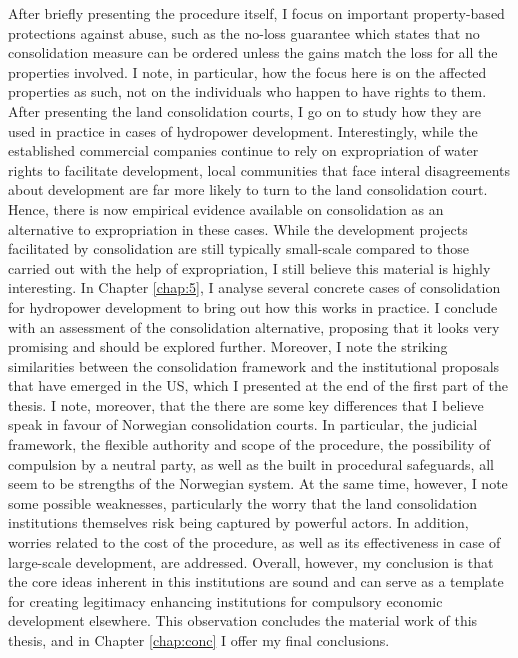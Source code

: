 \documentclass{article} %
\begin{document}
After briefly presenting the procedure itself, I focus on important property-based protections against abuse, such as the no-loss guarantee which states that no consolidation measure can be ordered unless the gains match the loss for all the properties involved. I note, in particular, how the focus here is on the affected properties as such, not on the individuals who happen to have rights to them. After presenting the land consolidation courts, I go on to study how they are used in practice in cases of hydropower development. Interestingly, while the established commercial companies continue to rely on expropriation of water rights to facilitate development, local communities that face interal disagreements about development are far more likely to turn to the land consolidation court. Hence, there is now empirical evidence available on consolidation as an alternative to expropriation in these cases. While the development projects facilitated by consolidation are still typically small-scale compared to those carried out with the help of expropriation, I still believe this material is highly interesting. In Chapter \ref{chap:5}, I analyse several concrete cases of consolidation for hydropower development to bring out how this works in practice. I conclude with an assessment of the consolidation alternative, proposing that it looks very promising and should be explored further. Moreover, I note the striking similarities between the consolidation framework and the institutional proposals that have emerged in the US, which I presented at the end of the first part of the thesis. I note, moreover, that the there are some key differences that I believe speak in favour of Norwegian consolidation courts. In particular, the judicial framework, the flexible authority and scope of the procedure, the possibility of compulsion by a neutral party, as well as the built in procedural safeguards, all seem to be strengths of the Norwegian system. At the same time, however, I note some possible weaknesses, particularly the worry that the land consolidation institutions themselves risk being captured by powerful actors. In addition, worries related to the cost of the procedure, as well as its effectiveness in case of large-scale development, are addressed. Overall, however, my conclusion is that the core ideas inherent in this institutions are sound and can serve as a template for creating legitimacy enhancing institutions for compulsory economic development elsewhere. This observation concludes the material work of this thesis, and in Chapter \ref{chap:conc} I offer my final conclusions.
\end{document}
